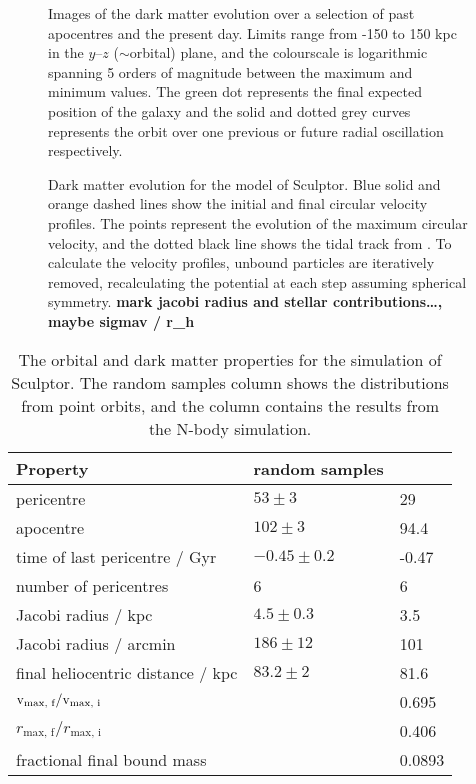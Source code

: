 \begin{figure}
\centering
{}
\caption[Sculptor simulation snapshots]{Images of the dark matter
evolution over a selection of past apocentres and the present day.
Limits range from -150 to 150 kpc in the \(y\)--\(z\) (\(\sim\)orbital)
plane, and the colourscale is logarithmic spanning 5 orders of magnitude
between the maximum and minimum values. The green dot represents the
final expected position of the galaxy and the solid and dotted grey
curves represents the orbit over one previous or future radial
oscillation respectively.}\label{fig:scl_sim_images}
\end{figure}

\begin{figure}
\centering
{}
\caption[Sculptor tidal tracks]{Dark matter evolution for the
\smallperi{} model of Sculptor. Blue solid and orange dashed lines show
the initial and final circular velocity profiles. The points represent
the evolution of the maximum circular velocity, and the dotted black
line shows the tidal track from \citet{EN2021}. To calculate the
velocity profiles, unbound particles are iteratively removed,
recalculating the potential at each step assuming spherical symmetry.
\textbf{mark jacobi radius and stellar contributions\ldots, maybe sigmav
/ r\_h}}\label{fig:scl_tidal_track}
\end{figure}

\begin{table*}[t]
\centering
\caption[Simulation results for Sculptor’s dark matter]{The orbital and dark matter properties for the simulation of Sculptor. The random samples column shows the distributions from point orbits, and the \smallperi{} column contains the results from the N-body simulation. }
\label{tbl:scl_sim_results}
\begin{tabular}{lll}
\toprule
Property & random samples & \smallperi{}\\
\midrule
pericentre & $53\pm3$ & 29\\
apocentre & $102\pm3$ & 94.4\\
time of last pericentre / Gyr & $-0.45 \pm 0.2$ & -0.47\\
number of pericentres & 6 & 6\\
Jacobi radius / kpc & $4.5 \pm 0.3$ & 3.5\\
Jacobi radius / arcmin & $186\pm12$ & 101\\
final heliocentric distance / kpc & $83.2\pm2$ & 81.6\\
${\rm v}_\textrm{max, f} / {\rm v}_\textrm{max, i}$ &  & 0.695\\
$r_\textrm{max, f} / r_\textrm{max, i}$ &  & 0.406\\
fractional final bound mass &  & 0.0893\\
\bottomrule
\end{tabular}
\end{table*}

